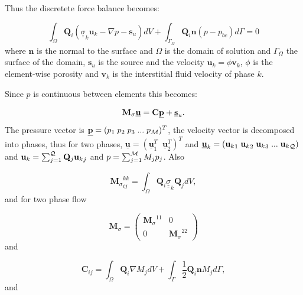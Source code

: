  Thus the discretete force balance becomes:

\begin{equation}
\int_\Omega {\mathbf Q}_i ({\underline {\underline \sigma}}_k {\mathbf u}_k - \nabla p -{\mathbf s}_u) dV 
+  \int_{\Gamma_{\Omega}} {\mathbf Q}_i {\mathbf n} (p - p_{bc}) d\Gamma =0
\label{force-semi-disc}
\end{equation}
where ${\mathbf n}$ is the normal to the surface 
and $\Omega$ is the domain of solution and 
${\Gamma_{\Omega}}$ the surface of the domain, ${\mathbf s}_u$ is 
the source and the velocity ${\mathbf u}_k = \phi {\mathbf v}_k$, 
$\phi$ is the 
element-wise 
porosity and ${\mathbf v}_k$ is the interstitial fluid velocity of phase $k$. 

Since $p$ is continuous between elements this becomes:

\begin{equation}
{\mathbf M}_\sigma \underline {\mathbf u} = {\mathbf C} \underline {\bf p} 
+ \underline {\bf s}_u. 
\label{force-balance-matrix-form}
\end{equation}
The pressure vector is $\underline{\bf p} =(p_1\; p_2 \; p_3\; ...\; p_{\cal M})^T$, 
the velocity vector is decomposed into phases, thus for two phases, 
$\underline{\mathbf u}=(\underline{\mathbf u}_1^T \;\; \underline{\mathbf u}_2^T)^T$ 
and $\underline{\mathbf u}_k=({{\mathbf u}_k}_1\; {{\mathbf u}_k}_2\; {{\mathbf u}_k}_3\; ...\; {{\mathbf u}_k}_{\cal Q}) $ 
and ${\mathbf u}_k = \sum_{j=1}^{\cal Q} {\mathbf Q}_j{{\mathbf u}_k}_j$ and 
$p=\sum_{j=1}^{\cal M} M_j{p}_j$. Also 


\begin{equation}
{{\mathbf M}_\sigma}^{kk}_{ij} =  \int_\Omega {\mathbf Q}_i 
{\underline {\underline \sigma}}_k {\mathbf Q}_j dV, 
\end{equation}
and for two phase flow

\begin{equation}
{{\mathbf M}_\sigma} = 
  \begin{pmatrix}
    {{\mathbf M}_\sigma}^{11}   & 0 \\
    0   & {{\mathbf M}_\sigma}^{22} 
  \end{pmatrix}
\label{m_sigma_matrix}
\end{equation}
and 

\begin{equation}
{\mathbf C}_{ij}=\int_\Omega {\mathbf Q}_i \nabla M_j dV 
+ \int_\Gamma \frac{1}{2}{\mathbf Q}_i {\mathbf n}  M_j d\Gamma,
\end{equation} 
and 

